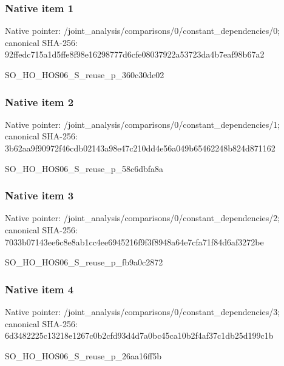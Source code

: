 \documentclass[10pt,a4paper]{article}
\begin{document}
\subsubsection{Native item 1}
Native pointer: /joint\_\allowbreak{}analysis/comparisons/0/constant\_\allowbreak{}dependencies/0; canonical SHA-256: 92ffedc715a1d5ffe8f98e16298777d6cfe08037922a53723da4b7eaf98b67a2

\begingroup\raggedright\sloppy SO\_\allowbreak{}HO\_\allowbreak{}HOS06\_\allowbreak{}S\_\allowbreak{}reuse\_\allowbreak{}p\_\allowbreak{}360c30de02\par\endgroup

\subsubsection{Native item 2}
Native pointer: /joint\_\allowbreak{}analysis/comparisons/0/constant\_\allowbreak{}dependencies/1; canonical SHA-256: 3b62aa9f90972f46cdb02143a98e47c210dd4e56a049b65462248b824d871162

\begingroup\raggedright\sloppy SO\_\allowbreak{}HO\_\allowbreak{}HOS06\_\allowbreak{}S\_\allowbreak{}reuse\_\allowbreak{}p\_\allowbreak{}58c6dbfa8a\par\endgroup

\subsubsection{Native item 3}
Native pointer: /joint\_\allowbreak{}analysis/comparisons/0/constant\_\allowbreak{}dependencies/2; canonical SHA-256: 7033b07143ee6c8e8ab1cc4ee6945216f9f3f8948a64e7cfa71f84d6af3272be

\begingroup\raggedright\sloppy SO\_\allowbreak{}HO\_\allowbreak{}HOS06\_\allowbreak{}S\_\allowbreak{}reuse\_\allowbreak{}p\_\allowbreak{}fb9a0c2872\par\endgroup

\subsubsection{Native item 4}
Native pointer: /joint\_\allowbreak{}analysis/comparisons/0/constant\_\allowbreak{}dependencies/3; canonical SHA-256: 6d3482225c13218e1267c0b2cfd93d4d7a0bc45ca10b2f4af37c1db25d199c1b

\begingroup\raggedright\sloppy SO\_\allowbreak{}HO\_\allowbreak{}HOS06\_\allowbreak{}S\_\allowbreak{}reuse\_\allowbreak{}p\_\allowbreak{}26aa16ff5b\par\endgroup
\end{document}
